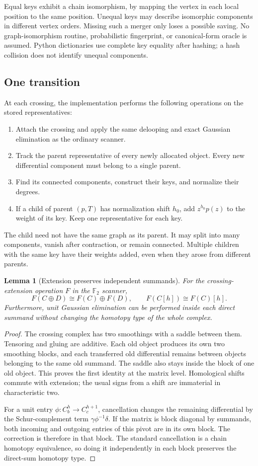 \documentclass[11pt,letterpaper]{article}
\newtheorem{lemma}[theorem]{Lemma}
\newcommand{\F}{\mathbb F_2}
\begin{document}
Equal keys exhibit a chain isomorphism, by mapping the vertex in each local
position to the same position. Unequal keys may describe isomorphic
components in different vertex orders. Missing such a merger only loses a
possible saving. No graph-isomorphism routine, probabilistic fingerprint,
or canonical-form oracle is assumed. Python dictionaries use complete
key equality after hashing; a hash collision does not identify unequal
components.

\subsection{One transition}
At each crossing, the implementation performs the following operations on
the stored representatives:
\begin{enumerate}
\item Attach the crossing and apply the same delooping and exact
Gaussian elimination as the ordinary scanner.
\item Track the parent representative of every newly allocated object.
Every new differential component must belong to a single parent.
\item Find its connected components, construct their keys, and normalize
their degrees.
\item If a child of parent $(p,T)$ has normalization shift $h_0$, add
$z^{h_0}p(z)$ to the weight of its key. Keep one representative for each key.
\end{enumerate}
The child need not have the same graph as its parent. It may split into many
components, vanish after contraction, or remain connected. Multiple children
with the same key have their weights added, even when they arose from
different parents.

\begin{lemma}[Extension preserves independent summands]
\label{lem:extension}
For the crossing-extension operation $F$ in the $\F$ scanner,
\[
 F(C\oplus D)\cong F(C)\oplus F(D),\qquad F(C[h])\cong F(C)[h].
\]
Furthermore, unit Gaussian elimination can be performed inside each direct
summand without changing the homotopy type of the whole complex.
\end{lemma}
\begin{proof}
The crossing complex has two smoothings with a saddle between them.
Tensoring and gluing are additive. Each old object produces its own two
smoothing blocks, and each transferred old differential remains between
objects belonging to the same old summand. The saddle also stays inside the
block of one old object. This proves the first identity at the matrix level.
Homological shifts commute with extension; the usual signs from a shift
are immaterial in characteristic two.

For a unit entry $\phi:C^h_b\to C^{h+1}_c$, cancellation changes the
remaining differential by the Schur-complement term
$\gamma\phi^{-1}\delta$. If the matrix is block diagonal by summands,
both incoming and outgoing entries of this pivot are in its own block.
The correction is therefore in that block. The standard cancellation
is a chain homotopy equivalence, so doing it independently in each block
preserves the direct-sum homotopy type.
\end{proof}
\end{document}
